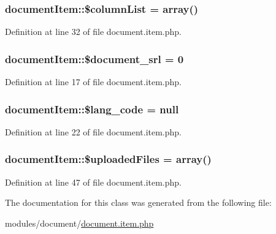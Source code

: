 \hypertarget{classdocumentItem_a244e1382304e15c5ae29e3311ef8e865}{
\subsubsection[{\$column\+List}]{\setlength{\rightskip}{0pt plus 5cm}document\+Item\+::\$column\+List = array()}}\label{classdocumentItem_a244e1382304e15c5ae29e3311ef8e865}


Definition at line 32 of file document.\+item.\+php.

\hypertarget{classdocumentItem_a87159d1cf24944d081646e6fe4f7e0f6}{
\subsubsection[{\$document\+\_\+srl}]{\setlength{\rightskip}{0pt plus 5cm}document\+Item\+::\$document\+\_\+srl = 0}}\label{classdocumentItem_a87159d1cf24944d081646e6fe4f7e0f6}


Definition at line 17 of file document.\+item.\+php.

\hypertarget{classdocumentItem_a5fa7aa5d52f248116250e95126e8ab87}{
\subsubsection[{\$lang\+\_\+code}]{\setlength{\rightskip}{0pt plus 5cm}document\+Item\+::\$lang\+\_\+code = null}}\label{classdocumentItem_a5fa7aa5d52f248116250e95126e8ab87}


Definition at line 22 of file document.\+item.\+php.

\hypertarget{classdocumentItem_a70d4321ea0edfb6c1fb0775ced8a6b41}{
\subsubsection[{\$uploaded\+Files}]{\setlength{\rightskip}{0pt plus 5cm}document\+Item\+::\$uploaded\+Files = array()}}\label{classdocumentItem_a70d4321ea0edfb6c1fb0775ced8a6b41}


Definition at line 47 of file document.\+item.\+php.



The documentation for this class was generated from the following file\+:\begin{DoxyCompactItemize}
\item 
modules/document/\hyperlink{document_8item_8php}{document.\+item.\+php}\end{DoxyCompactItemize}
